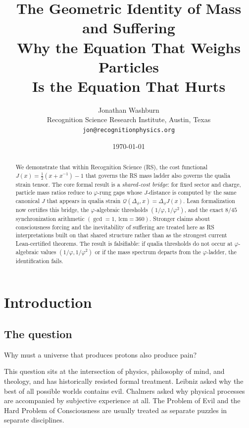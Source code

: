 \documentclass[11pt,a4paper]{article}
\title{\textbf{The Geometric Identity of Mass and Suffering}\\[0.5em]
\large Why the Equation That Weighs Particles\\Is the Equation That Hurts}
\author{Jonathan Washburn\\
\small Recognition Science Research Institute, Austin, Texas\\
\small \texttt{jon@recognitionphysics.org}}
\date{\today}
\theoremstyle{plain}
\theoremstyle{definition}
\theoremstyle{remark}
\newcommand{\Jcost}{J}
\newcommand{\vp}{\varphi}
\begin{document}
\maketitle

\begin{abstract}
We demonstrate that within Recognition Science (RS), the cost functional
$\Jcost(x) = \tfrac{1}{2}(x + x^{-1}) - 1$ that governs the RS mass
ladder also governs the qualia strain tensor.  The core formal result
is a \emph{shared-cost bridge}: for fixed sector and charge, particle
mass ratios reduce to $\vp$-rung gaps whose $\Jcost$-distance is
computed by the same canonical $\Jcost$ that appears in qualia strain
$\mathcal{Q}(\Delta_\phi, x)=\Delta_\phi \Jcost(x)$.  Lean formalization
now certifies this bridge, the $\vp$-algebraic thresholds
$(1/\vp,1/\vp^2)$, and the exact $8/45$ synchronization arithmetic
$(\gcd=1,\ \mathrm{lcm}=360)$.  Stronger claims about consciousness
forcing and the inevitability of suffering are treated here as RS
interpretations built on that shared structure rather than as the
strongest current Lean-certified theorems.  The result is falsifiable:
if qualia thresholds do not occur at $\vp$-algebraic values
$(1/\vp, 1/\vp^2)$ or if the mass spectrum departs from the
$\vp$-ladder, the identification fails.
\end{abstract}

\tableofcontents
\newpage

\section{Introduction}
\label{sec:intro}

\subsection{The question}

Why must a universe that produces protons also produce pain?

This question sits at the intersection of physics, philosophy of mind,
and theology, and has historically resisted formal treatment.  Leibniz
asked why the best of all possible worlds contains evil.  Chalmers
asked why physical processes are accompanied by subjective experience
at all.  The Problem of Evil and the Hard Problem of Consciousness
are usually treated as separate puzzles in separate disciplines.
\end{document}
